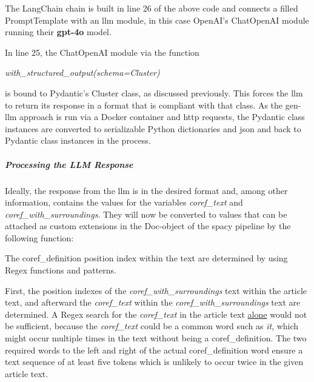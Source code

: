 
The LangChain chain is built in line 26 of the above code and connects a filled PromptTemplate with an \gls{llm} module, in this case OpenAI's ChatOpenAI module running their \textbf{gpt-4o} model.

In line 25, the ChatOpenAI module via the function
\begin{center}
\emph{with\_structured\_output(schema=Cluster)}
\end{center}
is bound to Pydantic's Cluster class, as discussed previously.
This forces the \gls{llm} to return its response in a format that is compliant with that class.
As the \gls{gen-llm} approach is run via a Docker container and http requests, the Pydantic class instances are converted to serializable Python dictionaries and \gls{json} and back to Pydantic class instances in the process.

\subparagraph{Processing the LLM Response}
Ideally, the response from the \gls{llm} is in the desired format and, among other information, contains the values for the variables \emph{coref\_text} and \emph{coref\_with\_surroundings}.
They will now be converted to values that can be attached as custom extensions in the Doc-object of the spacy pipeline by the following function:


The \gls{coref_definition} position index within the text are determined by using \gls{Regex} functions and patterns.

First, the position indexes of the \emph{coref\_with\_surroundings} text within the article text, and afterward the \emph{coref\_text} within the \emph{coref\_with\_surroundings} text are determined.
A \gls{Regex} search for the \emph{coref\_text} in the article text \underline{alone} would not be sufficient,
because the \emph{coref\_text} could be a common word such as \emph{it}, which might occur multiple times in the text without being a \gls{coref_definition}.
The two required words to the left and right of the actual \gls{coref_definition} word ensure a text sequence of at least five \glspl{token} which is unlikely to occur twice in the given article text.

